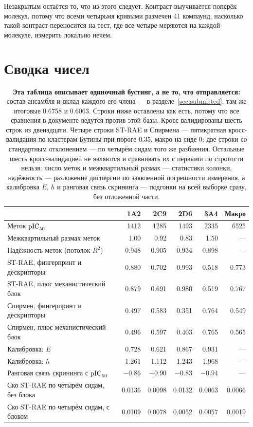 Незакрытым остаётся то, что из этого следует. Контраст выучивается поперёк молекул, потому что
всеми четырьмя кривыми размечен 41 компаунд; насколько такой контраст переносится на тест, где
все четыре меряются на каждой молекуле, измерить локально нечем.

\section{Сводка чисел}

\begin{table}[htbp]\centering\small
\begin{tabularx}{\textwidth}{@{}Xrrrrr@{}}
\toprule
& 1A2 & 2C9 & 2D6 & 3A4 & Макро \\
\midrule
Меток $\mathrm{pIC}_{50}$ & 1412 & 1285 & 1493 & 2335 & 6525 \\
Межквартильный размах меток & 1.00 & 0.92 & 0.83 & 1.50 & --- \\
Надёжность меток (потолок $R^2$) & 0.948 & 0.905 & 0.934 & 0.898 & --- \\
\addlinespace[2pt]
ST-RAE, фингерпринт и дескрипторы & 0.880 & 0.702 & 0.993 & 0.518 & 0.773 \\
ST-RAE, плюс механистический блок & 0.879 & 0.691 & 0.980 & 0.519 & 0.767 \\
Спирмен, фингерпринт и дескрипторы & 0.497 & 0.583 & 0.351 & 0.764 & 0.549 \\
Спирмен, плюс механистический блок & 0.496 & 0.597 & 0.403 & 0.765 & 0.565 \\
\addlinespace[2pt]
Калибровка: $E$ & 0.728 & 0.621 & 0.867 & 0.931 & --- \\
Калибровка: $h$ & 1.261 & 1.112 & 1.243 & 1.968 & --- \\
Ранговая связь скрининга с $\mathrm{pIC}_{50}$ & $-0.86$ & $-0.90$ & $-0.83$ & $-0.94$ & --- \\
\addlinespace[2pt]
Ско ST-RAE по четырём сидам, без блока & 0.0136 & 0.0098 & 0.0132 & 0.0063 & 0.0066 \\
Ско ST-RAE по четырём сидам, с блоком & 0.0109 & 0.0078 & 0.0052 & 0.0057 & 0.0019 \\
\bottomrule
\end{tabularx}
\caption{\textbf{Эта таблица описывает одиночный бустинг, а не то, что отправляется:} состав
ансамбля и вклад каждого его члена --- в разделе~\ref{sec:submitted}, там же итоговые 0.6758 и
0.6063. Строки ниже оставлены как есть, потому что все сравнения в документе ведутся против
этой базы. Кросс-валидированы шесть строк из двенадцати. Четыре строки ST-RAE и Спирмена --- пятикратная
кросс-валидация по кластерам Бутины при пороге 0.35, макро на сиде 0; две строки со стандартным
отклонением --- по четырём сидам того же разбиения. Остальные шесть кросс-валидацией не являются и
сравнивать их с первыми по строгости нельзя: число меток и межквартильный размах --- статистики колонки,
надёжность --- разложение дисперсии по заявленной погрешности измерения, а калибровка $E$, $h$ и ранговая
связь скрининга --- подгонки на всей выборке сразу, без отложенной части.}
\end{table}


